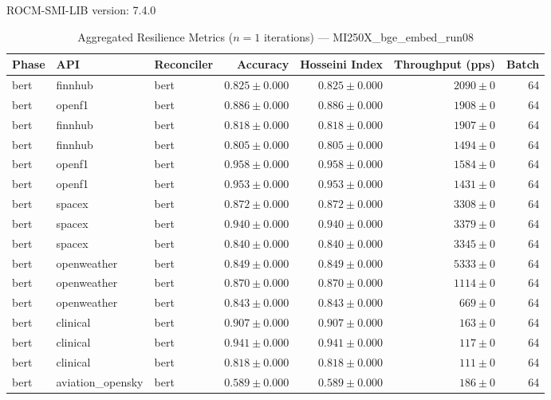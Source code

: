 ROCM-SMI-LIB version: 7.4.0

\begin{table}[htbp]
\caption{Aggregated Resilience Metrics ($n=1$ iterations) --- MI250X_bge_embed_run08}
\begin{tabular}{l l l r r r r}
\hline
Phase & API & Reconciler & Accuracy & Hosseini Index & Throughput (pps) & Batch \\
\hline
bert & finnhub & bert & $0.825\pm0.000$ & $0.825\pm0.000$ & $2090\pm0$ & 64 \\
bert & openf1 & bert & $0.886\pm0.000$ & $0.886\pm0.000$ & $1908\pm0$ & 64 \\
bert & finnhub & bert & $0.818\pm0.000$ & $0.818\pm0.000$ & $1907\pm0$ & 64 \\
bert & finnhub & bert & $0.805\pm0.000$ & $0.805\pm0.000$ & $1494\pm0$ & 64 \\
bert & openf1 & bert & $0.958\pm0.000$ & $0.958\pm0.000$ & $1584\pm0$ & 64 \\
bert & openf1 & bert & $0.953\pm0.000$ & $0.953\pm0.000$ & $1431\pm0$ & 64 \\
bert & spacex & bert & $0.872\pm0.000$ & $0.872\pm0.000$ & $3308\pm0$ & 64 \\
bert & spacex & bert & $0.940\pm0.000$ & $0.940\pm0.000$ & $3379\pm0$ & 64 \\
bert & spacex & bert & $0.840\pm0.000$ & $0.840\pm0.000$ & $3345\pm0$ & 64 \\
bert & openweather & bert & $0.849\pm0.000$ & $0.849\pm0.000$ & $5333\pm0$ & 64 \\
bert & openweather & bert & $0.870\pm0.000$ & $0.870\pm0.000$ & $1114\pm0$ & 64 \\
bert & openweather & bert & $0.843\pm0.000$ & $0.843\pm0.000$ & $669\pm0$ & 64 \\
bert & clinical & bert & $0.907\pm0.000$ & $0.907\pm0.000$ & $163\pm0$ & 64 \\
bert & clinical & bert & $0.941\pm0.000$ & $0.941\pm0.000$ & $117\pm0$ & 64 \\
bert & clinical & bert & $0.818\pm0.000$ & $0.818\pm0.000$ & $111\pm0$ & 64 \\
bert & aviation\_opensky & bert & $0.589\pm0.000$ & $0.589\pm0.000$ & $186\pm0$ & 64 \\

\end{tabular}
\end{table}
